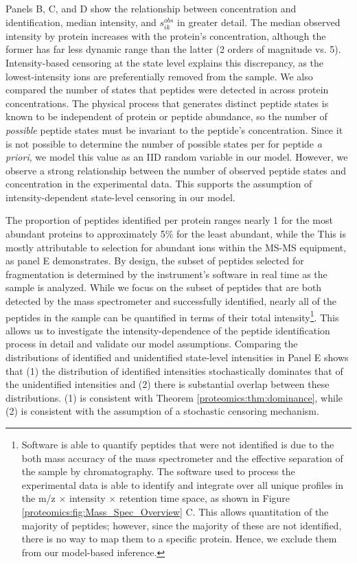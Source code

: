 Panels B, C, and D show the relationship between concentration and identification, median intensity, and $s_{ik}^{obs}$ in greater detail.
The median observed intensity by protein increases with the protein's concentration, although the former has far less dynamic range than the latter (2 orders of magnitude vs. 5).
Intensity-based censoring at the state level explains this discrepancy, as the lowest-intensity ions are preferentially removed from the sample.
%
We also compared the number of states that peptides were detected in across protein concentrations.
The physical process that generates distinct peptide states is known to be independent of protein or peptide abundance, so the number of \emph{possible} peptide states must be invariant to the peptide's concentration.
Since it is not possible to determine the number of possible states per for peptide \emph{a priori}, we model this value as an IID random variable in our model.
However, we observe a strong relationship between the number of observed peptide states and concentration in the experimental data.
This supports the assumption of intensity-dependent state-level censoring in our model.

The proportion of peptides identified per protein ranges nearly 1 for the most abundant proteins to approximately 5\% for the least abundant, while the 
This is mostly attributable to selection for abundant ions within the MS-MS equipment, as panel E demonstrates.
By design, the subset of peptides selected for fragmentation is determined by the instrument's software in real time as the sample is analyzed.
While we focus on the subset of peptides that are both detected by the mass spectrometer and successfully identified, nearly all of the peptides in the sample can be quantified in terms of their total intensity\footnote{
Software is able to quantify peptides that were not identified is due to the both mass accuracy of the mass spectrometer and the effective separation of the sample by chromatography.
The software used to process the experimental data \citep{Cox:2008uu} is able to identify and integrate over all unique profiles in the m/z $\times$ intensity $\times$ retention time space, as shown in Figure \ref{proteomics:fig:Mass_Spec_Overview} C.
This allows quantitation of the majority of peptides; however, since the majority of these are not identified, there is no way to map them to a specific protein.
Hence, we exclude them from our model-based inference.}.
This allows us to investigate the intensity-dependence of the peptide identification process in detail and validate our model assumptions.
Comparing the distributions of identified and unidentified state-level intensities in Panel E shows that (1) the distribution of identified intensities stochastically dominates that of the unidentified intensities and (2) there is substantial overlap between these distributions.
(1) is consistent with Theorem \ref{proteomics:thm:dominance}, while (2) is consistent with the assumption of a stochastic censoring mechanism.

